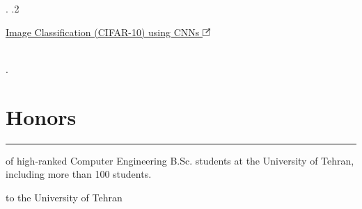 \documentclass[]{rahulworld-resume}
\begin{document}
\begin{minipage}[t]{0.97\textwidth}
\begin{minipage}{\linewidth}
{\begin{minipage}{0.84\textwidth}
			\end{minipage}.
			.2  \begin{minipage}{0.84\textwidth}\vspace{3pt}\normalfont
				\large\href{https://github.com/BehzadShayegh/CIFAR10-CNN}{Image Classification (CIFAR-10) using CNNs \includegraphics[width=8pt]{icons/redirect.png}}
				\\\vspace{3pt}
				\normalfont\normalsize{}
				\\\vspace{3pt}
			\end{minipage}.
		}
	\end{minipage}
	\sectionsep

	\begin{minipage}[t]{0.54\textwidth}
		\begin{minipage}[t]{\textwidth}
			\section{Honors}
			\vspace{-5pt}\noindent\rule{\textwidth}{0.4pt}\vspace{5pt}
			
			\begin{minipage}{0.11\textwidth} %
				\vspace{-3pt}
			\end{minipage}
			\begin{minipage}{0.89\textwidth\vspace{4pt}}
				\normalsize of high-ranked Computer Engineering B.Sc. students at the University of Tehran, including more than 100 students.
			\end{minipage}

			\begin{minipage}{0.11\textwidth} %
				\vspace{-3pt}
			\end{minipage}
			\begin{minipage}{0.89\textwidth\vspace{4pt}}
				\normalsize to the University of Tehran
			\end{minipage}


\end{minipage}
\end{minipage}
\end{minipage}
\end{document}
